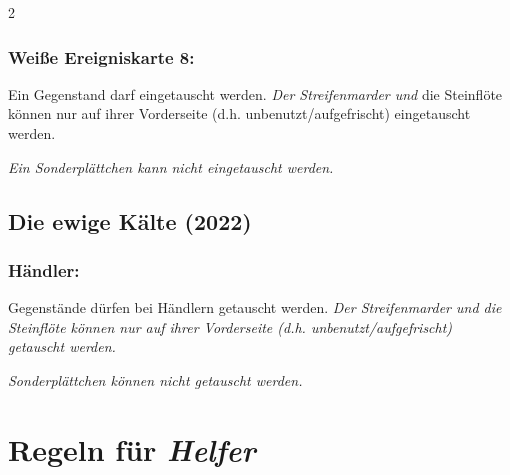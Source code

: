 \documentclass[10pt, a4paper, oneside]{book}
\newcommand{\fan}[1]{\textit{#1}}
\begin{document}
\begin{multicols*}{2}
\begin{bgcolor}[color-bb]
\subsection{Weiße Ereigniskarte 8:}

Ein Gegenstand darf eingetauscht werden.
\fan{Der Streifenmarder und} die Steinflöte können nur auf ihrer Vorderseite (d.h. unbenutzt/aufgefrischt) eingetauscht werden. 
\supercite{bb-ereigniskarte-8}

\fan{Ein Sonderplättchen kann nicht eingetauscht werden.}



\end{bgcolor}



\begin{bgcolor}
\section{Die ewige Kälte (2022)}

\subsection{Händler:}

Gegenstände dürfen bei Händlern getauscht werden.
\fan{Der Streifenmarder und die Steinflöte können nur auf ihrer Vorderseite (d.h. unbenutzt/aufgefrischt) getauscht werden.}

\fan{Sonderplättchen können nicht getauscht werden.}

\end{bgcolor}



\end{multicols*}






\chapter{Regeln für \fan{Helfer}}
\label{helfer}
\end{document}
